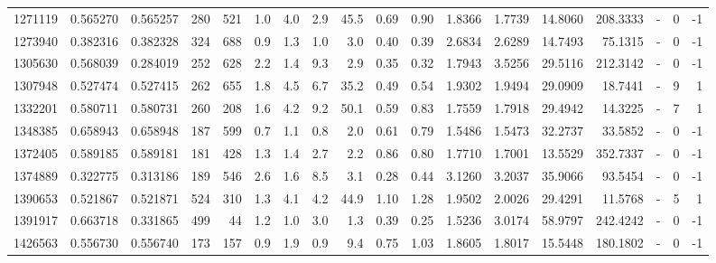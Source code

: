 \begin{tabular}{rrrrrrrrrrrrrrrlrr}
   1271119 & 0.565270 &   0.565257 &  280 &  521 &      1.0 &      4.0 &     2.9 &     45.5 &       0.69 &        0.90 &  1.8366 &  1.7739 &   14.8060 &  208.3333 &             - &        0 &         -1 \\
   1273940 & 0.382316 &   0.382328 &  324 &  688 &      0.9 &      1.3 &     1.0 &      3.0 &       0.40 &        0.39 &  2.6834 &  2.6289 &   14.7493 &   75.1315 &             - &        0 &         -1 \\
   1305630 & 0.568039 &   0.284019 &  252 &  628 &      2.2 &      1.4 &     9.3 &      2.9 &       0.35 &        0.32 &  1.7943 &  3.5256 &   29.5116 &  212.3142 &             - &        0 &         -1 \\
   1307948 & 0.527474 &   0.527415 &  262 &  655 &      1.8 &      4.5 &     6.7 &     35.2 &       0.49 &        0.54 &  1.9302 &  1.9494 &   29.0909 &   18.7441 &             - &        9 &          1 \\
   1332201 & 0.580711 &   0.580731 &  260 &  208 &      1.6 &      4.2 &     9.2 &     50.1 &       0.59 &        0.83 &  1.7559 &  1.7918 &   29.4942 &   14.3225 &             - &        7 &          1 \\
   1348385 & 0.658943 &   0.658948 &  187 &  599 &      0.7 &      1.1 &     0.8 &      2.0 &       0.61 &        0.79 &  1.5486 &  1.5473 &   32.2737 &   33.5852 &             - &        0 &         -1 \\
   1372405 & 0.589185 &   0.589181 &  181 &  428 &      1.3 &      1.4 &     2.7 &      2.2 &       0.86 &        0.80 &  1.7710 &  1.7001 &   13.5529 &  352.7337 &             - &        0 &         -1 \\
   1374889 & 0.322775 &   0.313186 &  189 &  546 &      2.6 &      1.6 &     8.5 &      3.1 &       0.28 &        0.44 &  3.1260 &  3.2037 &   35.9066 &   93.5454 &             - &        0 &         -1 \\
   1390653 & 0.521867 &   0.521871 &  524 &  310 &      1.3 &      4.1 &     4.2 &     44.9 &       1.10 &        1.28 &  1.9502 &  2.0026 &   29.4291 &   11.5768 &             - &        5 &          1 \\
   1391917 & 0.663718 &   0.331865 &  499 &   44 &      1.2 &      1.0 &     3.0 &      1.3 &       0.39 &        0.25 &  1.5236 &  3.0174 &   58.9797 &  242.4242 &             - &        0 &         -1 \\
   1426563 & 0.556730 &   0.556740 &  173 &  157 &      0.9 &      1.9 &     0.9 &      9.4 &       0.75 &        1.03 &  1.8605 &  1.8017 &   15.5448 &  180.1802 &             - &        0 &         -1 \\

\end{tabular}
